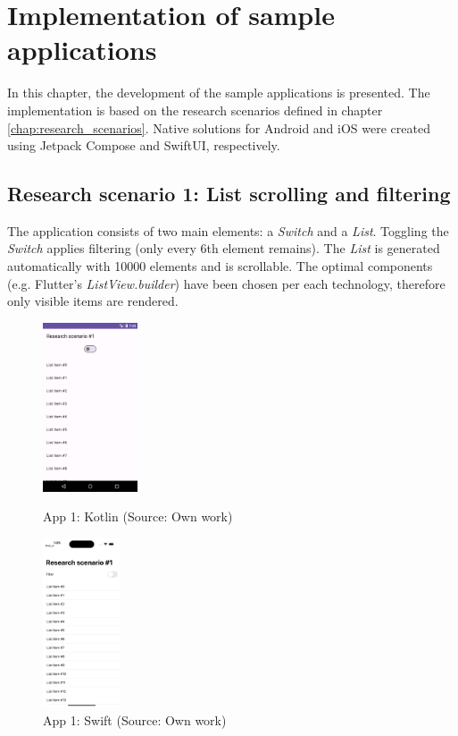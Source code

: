 
\chapter{Implementation of sample applications}

In this chapter, the development of the sample applications is presented. The implementation is based on the research scenarios defined in chapter \ref{chap:research_scenarios}. Native solutions for Android and iOS were created using Jetpack Compose and SwiftUI, respectively.

\section{Research scenario 1: List scrolling and filtering}

The application consists of two main elements: a \emph{Switch} and a \emph{List}. Toggling the \emph{Switch} applies filtering (only every 6th element remains). The \emph{List} is generated automatically with 10000 elements and is scrollable. The optimal components (e.g. Flutter's \emph{ListView.builder}) have been chosen per each technology, therefore only visible items are rendered.

\begin{figure}[H]
    \begin{minipage}{.47\textwidth}
      \centering
      \includegraphics[height=50mm]{img/app1_kotlin}
      \caption{App 1: Kotlin (Source: Own work)}
      \label{fig:app1_kotlin}
    \end{minipage}
    \hfill
    \begin{minipage}{.47\textwidth}
      \centering
      \includegraphics[height=50mm]{img/app1_swift}
      \caption{App 1: Swift (Source: Own work)}
      \label{fig:app1_swift}
    \end{minipage}
\end{figure}

